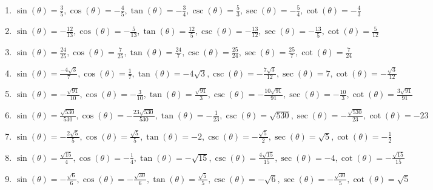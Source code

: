 \begin{enumerate}

\setcounter{enumi}{\value{HW}}

\item $\sin(\theta) = \frac{3}{5}, \cos(\theta) = -\frac{4}{5}, \tan(\theta) = -\frac{3}{4}, \csc(\theta) = \frac{5}{3}, \sec(\theta) = -\frac{5}{4}, \cot(\theta) = -\frac{4}{3}$

\item $\sin(\theta) = -\frac{12}{13}, \cos(\theta) = -\frac{5}{13}, \tan(\theta) = \frac{12}{5}, \csc(\theta) = -\frac{13}{12}, \sec(\theta) = -\frac{13}{5}, \cot(\theta) = \frac{5}{12}$

\item $\sin(\theta) = \frac{24}{25}, \cos(\theta) = \frac{7}{25}, \tan(\theta) = \frac{24}{7}, \csc(\theta) = \frac{25}{24}, \sec(\theta) = \frac{25}{7}, \cot(\theta) = \frac{7}{24}$

\item $\sin(\theta) = \frac{-4\sqrt{3}}{7}, \cos(\theta) = \frac{1}{7}, \tan(\theta) = -4\sqrt{3}, \csc(\theta) = -\frac{7\sqrt{3}}{12}, \sec(\theta) = 7, \cot(\theta) = -\frac{\sqrt{3}}{12}$

\item $\sin(\theta) = -\frac{\sqrt{91}}{10}, \cos(\theta) = -\frac{3}{10}, \tan(\theta) = \frac{\sqrt{91}}{3}, \csc(\theta) = -\frac{10\sqrt{91}}{91}, \sec(\theta) = -\frac{10}{3}, \cot(\theta) = \frac{3\sqrt{91}}{91}$

\item $\sin(\theta) = \frac{\sqrt{530}}{530}, \cos(\theta) = -\frac{23\sqrt{530}}{530}, \tan(\theta) = -\frac{1}{23}, \csc(\theta) = \sqrt{530}, \sec(\theta) = -\frac{\sqrt{530}}{23}, \cot(\theta) = -23$

\item $\sin(\theta) = -\frac{2\sqrt{5}}{5}, \cos(\theta) = \frac{\sqrt{5}}{5}, \tan(\theta) = -2, \csc(\theta) = -\frac{\sqrt{5}}{2}, \sec(\theta) = \sqrt{5}, \cot(\theta) = -\frac{1}{2}$

\item  $\sin(\theta) = \frac{\sqrt{15}}{4}, \cos(\theta) = -\frac{1}{4}, \tan(\theta) = -\sqrt{15}, \csc(\theta) = \frac{4\sqrt{15}}{15}, \sec(\theta) = -4, \cot(\theta) = -\frac{\sqrt{15}}{15}$

\item $\sin(\theta) = -\frac{\sqrt{6}}{6}, \cos(\theta) = -\frac{\sqrt{30}}{6}, \tan(\theta) = \frac{\sqrt{5}}{5}, \csc(\theta) = -\sqrt{6}, \sec(\theta) = -\frac{\sqrt{30}}{5}, \cot(\theta) = \sqrt{5}$


\end{enumerate}
